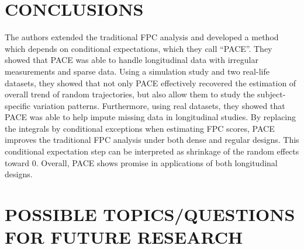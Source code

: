 \documentclass[11pt]{report}
\begin{document}
\section{CONCLUSIONS}
The authors extended the traditional FPC analysis and developed a method which depends on conditional expectations, which they call ``PACE''.
They showed that PACE was able to handle longitudinal data with irregular measurements and sparse data. 
Using a simulation study and two real-life datasets, they showed that not only PACE effectively recovered the estimation of overall trend of random trajectories, but also allow them to study the subject-specific variation patterns. 
Furthermore, using real datasets, they showed that PACE was able to help impute missing data in longitudinal studies. 
By replacing the integrals by conditional exceptions when estimating FPC scores, PACE improves the traditional FPC analysis under both dense and regular designs. 
This conditional expectation step can be interpreted as shrinkage of the random effects toward 0.  
Overall, PACE shows promise in applications of both longitudinal designs. 


\section{POSSIBLE TOPICS/QUESTIONS FOR FUTURE RESEARCH}
\end{document}
